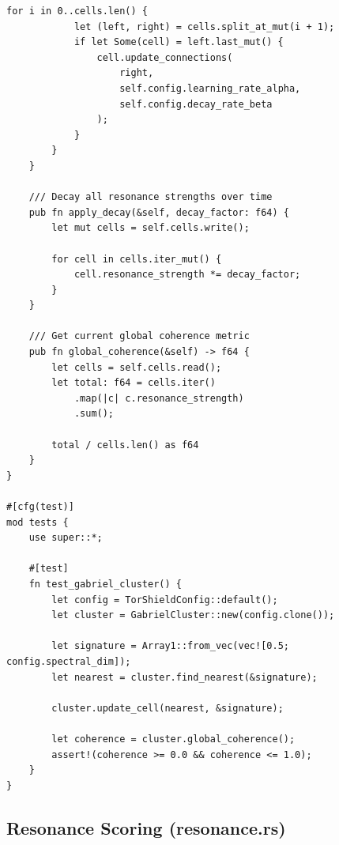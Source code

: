 \documentclass[11pt,a4paper]{article}
\begin{document}
\begin{lstlisting}[style=rust]
        for i in 0..cells.len() {
            let (left, right) = cells.split_at_mut(i + 1);
            if let Some(cell) = left.last_mut() {
                cell.update_connections(
                    right, 
                    self.config.learning_rate_alpha, 
                    self.config.decay_rate_beta
                );
            }
        }
    }
    
    /// Decay all resonance strengths over time
    pub fn apply_decay(&self, decay_factor: f64) {
        let mut cells = self.cells.write();
        
        for cell in cells.iter_mut() {
            cell.resonance_strength *= decay_factor;
        }
    }
    
    /// Get current global coherence metric
    pub fn global_coherence(&self) -> f64 {
        let cells = self.cells.read();
        let total: f64 = cells.iter()
            .map(|c| c.resonance_strength)
            .sum();
        
        total / cells.len() as f64
    }
}

#[cfg(test)]
mod tests {
    use super::*;
    
    #[test]
    fn test_gabriel_cluster() {
        let config = TorShieldConfig::default();
        let cluster = GabrielCluster::new(config.clone());
        
        let signature = Array1::from_vec(vec![0.5; config.spectral_dim]);
        let nearest = cluster.find_nearest(&signature);
        
        cluster.update_cell(nearest, &signature);
        
        let coherence = cluster.global_coherence();
        assert!(coherence >= 0.0 && coherence <= 1.0);
    }
}
\end{lstlisting}

\subsection{Resonance Scoring (resonance.rs)}
\end{document}
